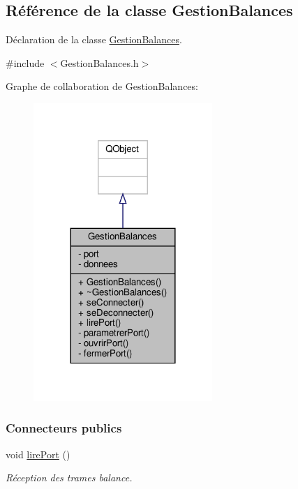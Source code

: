 \hypertarget{class_gestion_balances}{}\subsection{Référence de la classe Gestion\+Balances}
\label{class_gestion_balances}


Déclaration de la classe \hyperlink{class_gestion_balances}{Gestion\+Balances}.  




{\ttfamily \#include $<$Gestion\+Balances.\+h$>$}



Graphe de collaboration de Gestion\+Balances\+:\nopagebreak
\begin{figure}[H]
\begin{center}
\leavevmode
\includegraphics[width=192pt]{class_gestion_balances__coll__graph}
\end{center}
\end{figure}
\subsubsection*{Connecteurs publics}
\begin{DoxyCompactItemize}
\item 
void \hyperlink{class_gestion_balances_a4f3f6a424fce484321d239fa9f7fa15f}{lire\+Port} ()
\begin{DoxyCompactList}\small\item\em Réception des trames balance. \end{DoxyCompactList}\end{DoxyCompactItemize}
